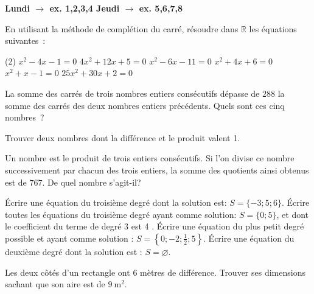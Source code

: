 \documentclass[a4paper,12pt]{report}
\begin{document}
{\bfseries Lundi $\longrightarrow$ ex. 1,2,3,4  \hfill Jeudi $\longrightarrow$ ex. 5,6,7,8}

\begin{exo}[2]
En utilisant la méthode de complétion du carré, résoudre dans $\mathbb{R}$ les équations suivantes~:
\begin{tasks}(2)
\task $x^2-4 x-1=0$
\task $4 x^2+12 x+5=0$
\task $x^2-6 x-11=0$
\task $x^2+4 x+6=0$
\task $x^2+x-1=0$
\task $25 x^2+30 x+2=0$
\end{tasks}
\end{exo}
\begin{exo}[2]
La somme des carrés de trois nombres entiers consécutifs dépasse de $288$ la somme des carrés des deux nombres entiers précédents. Quels sont ces cinq nombres~?
\end{exo}
\begin{exo}[1]
	Trouver deux nombres dont la différence et le produit valent 1.
\end{exo}
\begin{exo}[2]
Un nombre est le produit de trois entiers consécutifs. Si l'on divise ce nombre successivement par chacun des trois entiers, la somme des quotients ainsi obtenus est de $767$.
De quel nombre s'agit-il?
\end{exo}
\begin{exo}[2]
	\begin{tasks}
\task Écrire une équation du troisième degré dont la solution est: $S=\{-3 ; 5 ; 6\}$.
\task Écrire toutes les équations du troisième degré ayant comme solution: $S=\{0 ; 5\}$, et dont le coefficient du terme de degré 3 est 4 .
\task Écrire une équation du plus petit degré possible et ayant comme solution : $S=\left\{0 ;-2 ; \frac{1}{2} ; 5\right\}$.
\task Écrire une équation du deuxième degré dont la solution est : $S=\varnothing$.
	\end{tasks}
\end{exo}
\begin{exo}[1]	
Les deux côtés d'un rectangle ont $6$ mètres de différence. Trouver ses dimensions sachant que son aire est de $9 \mathrm{~m}^2$.
\end{exo}
\end{document}
